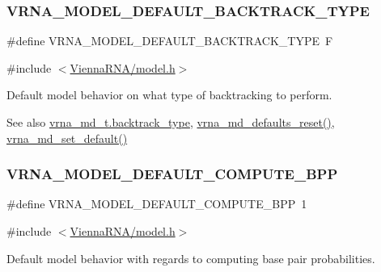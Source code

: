 \subsubsection{\texorpdfstring{VRNA\_MODEL\_DEFAULT\_BACKTRACK\_TYPE}{VRNA\_MODEL\_DEFAULT\_BACKTRACK\_TYPE}}
{\footnotesize\ttfamily \#define V\+R\+N\+A\+\_\+\+M\+O\+D\+E\+L\+\_\+\+D\+E\+F\+A\+U\+L\+T\+\_\+\+B\+A\+C\+K\+T\+R\+A\+C\+K\+\_\+\+T\+Y\+PE~\textquotesingle{}F\textquotesingle{}}



{\ttfamily \#include $<$\mbox{\hyperlink{model_8h}{Vienna\+R\+N\+A/model.\+h}}$>$}



Default model behavior on what type of backtracking to perform. 

\begin{DoxySeeAlso}{See also}
\mbox{\hyperlink{group__model__details_abb265da25121d22ed11c8435861f0e53}{vrna\+\_\+md\+\_\+t.\+backtrack\+\_\+type}}, \mbox{\hyperlink{group__model__details_ga70834424cf804d149937de89f80ceb45}{vrna\+\_\+md\+\_\+defaults\+\_\+reset()}}, \mbox{\hyperlink{group__model__details_ga8ac6ff84936282436f822644bf841f66}{vrna\+\_\+md\+\_\+set\+\_\+default()}} 
\end{DoxySeeAlso}
\mbox{\label{group__model__details_ga1d6cd5051940b126c248147c011bac6c}} 
\subsubsection{\texorpdfstring{VRNA\_MODEL\_DEFAULT\_COMPUTE\_BPP}{VRNA\_MODEL\_DEFAULT\_COMPUTE\_BPP}}
{\footnotesize\ttfamily \#define V\+R\+N\+A\+\_\+\+M\+O\+D\+E\+L\+\_\+\+D\+E\+F\+A\+U\+L\+T\+\_\+\+C\+O\+M\+P\+U\+T\+E\+\_\+\+B\+PP~1}



{\ttfamily \#include $<$\mbox{\hyperlink{model_8h}{Vienna\+R\+N\+A/model.\+h}}$>$}



Default model behavior with regards to computing base pair probabilities. 

